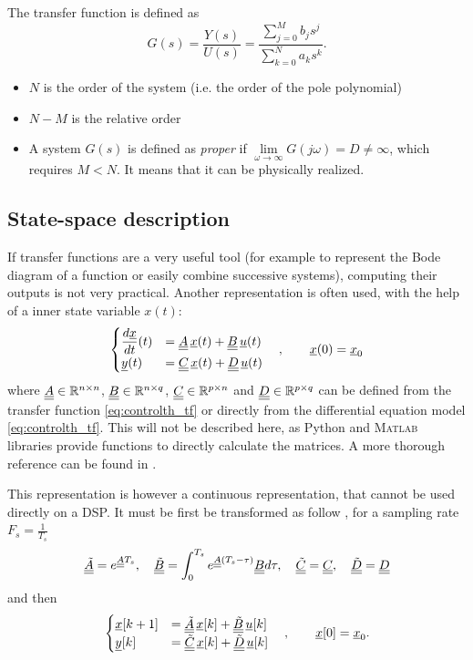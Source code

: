 The transfer function is defined as
\begin{equation}
	\label{eq:controlth_tf}
	G(s) = \frac{Y(s)}{U(s)} = \frac{\sum\limits_{j=0}^M b_j s^j}{\sum\limits_{k=0}^N a_k s^k}.
\end{equation}

\begin{itemize}
	\item $N$ is the order of the system (i.e. the order of the pole polynomial) 
	\item $N-M$ is the relative order
	\item A system $G(s)$ is defined as \emph{proper} if $\lim\limits_{\omega \rightarrow \infty} G(j\omega) = D \neq \infty$, which requires $M < N$. It means that it can be physically realized.
\end{itemize}

\subsection{State-space description}
If transfer functions are a very useful tool (for example to represent the Bode diagram of a function or easily combine successive systems), computing their outputs is not very practical. Another representation is often used, with the help of a inner state variable $x(t)$:
\begin{equation}
\begin{cases}
	\dfrac{d \underline{x}}{dt}(t) &= \underline{\underline{A}}\,\underline{x}(t) + \underline{\underline{B}}\, \underline{u}(t) \\
	\underline{y}(t) &= \underline{\underline{C}}\,\underline{x}(t) + \underline{\underline{D}} \,\underline{u}(t)
\end{cases}
\quad , \qquad \underline{x}(0) = \underline{x}_0
\end{equation}
where $\underline{\underline{A}} \in \mathbb{R}^{n \times n}$, $\underline{\underline{B}} \in \mathbb{R}^{n \times q}$, $\underline{\underline{C}} \in \mathbb{R}^{p \times n}$ and $\underline{\underline{D}} \in \mathbb{R}^{p \times q}$ can be defined from the transfer function \cref{eq:controlth_tf} or directly from the differential equation model \cref{eq:controlth_tf}. This will not be described here, as Python and \textsc{Matlab} libraries provide functions to directly calculate the matrices. A more thorough reference can be found in \cite{lect:king-ident}.

This representation is however a continuous representation, that cannot be used directly on a DSP. It must be first be transformed as follow \cite{lect:king-ident}, for a sampling rate $F_s = \frac{1}{T_s}$ 
\begin{equation}
	\underline{\underline{\tilde{A}}} = e^{\underline{\underline{A}} T_s}, \quad
	\underline{\underline{\tilde{B}}} = \int_0^{T_s} e^{\underline{\underline{A}} (T_s-\tau)} \underline{\underline{B}} d\tau,\quad
	\underline{\underline{\tilde{C}}} = \underline{\underline{C}}, \quad
	\underline{\underline{\tilde{D}}} = \underline{\underline{D}}
\end{equation}
and then 
\begin{equation}
\label{eq:controlth_ss}
	\begin{cases}
		\underline{x}[k+1] &= \underline{\underline{\tilde{A}}}\,\underline{x}[k] + \underline{\underline{\tilde{B}}}\, \underline{u}[k] \\
		\underline{y}[k] &= \underline{\underline{\tilde{C}}}\,\underline{x}[k] + \underline{\underline{\tilde{D}}} \,\underline{u}[k]
	\end{cases}
	\quad , \qquad \underline{x}[0] = \underline{x}_0.
\end{equation}

